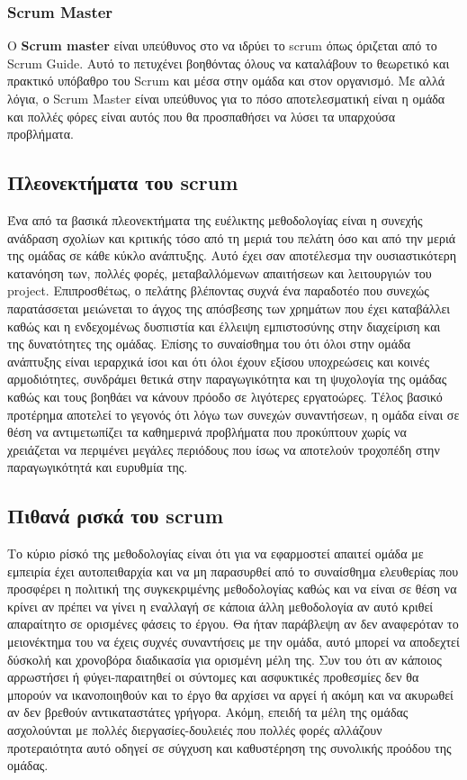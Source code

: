 \subsubsection{Scrum Master}

Ο \textbf{Scrum master} είναι υπεύθυνος στο να ιδρύει το scrum όπως όριζεται από το Scrum Guide. 
Αυτό το πετυχένει βοηθόντας όλους να καταλάβουν το θεωρετικό και πρακτικό υπόβαθρο του Scrum και μέσα στην ομάδα και στον οργανισμό.
Με αλλά λόγια, ο Scrum Master είναι υπεύθυνος για το πόσο αποτελεσματική είναι η ομάδα και πολλές φόρες είναι αυτός που θα προσπαθήσει να λύσει τα υπαρχούσα προβλήματα. 

\subsection{Πλεονεκτήματα του scrum}

Ένα από τα βασικά πλεονεκτήματα της ευέλικτης μεθοδολογίας είναι η συνεχής ανάδραση σχολίων και κριτικής τόσο από τη μεριά του πελάτη όσο και από την μεριά της ομάδας σε κάθε κύκλο ανάπτυξης.
Αυτό έχει σαν αποτέλεσμα την ουσιαστικότερη κατανόηση των, πολλές φορές, μεταβαλλόμενων απαιτήσεων και λειτουργιών του project.
Επιπροσθέτως, ο πελάτης βλέποντας συχνά ένα παραδοτέο που συνεχώς παρατάσσεται μειώνεται το άγχος της απόσβεσης των χρημάτων που έχει καταβάλλει καθώς και η ενδεχομένως δυσπιστία και έλλειψη εμπιστοσύνης στην διαχείριση και της δυνατότητες της ομάδας.
Επίσης το συναίσθημα του ότι όλοι στην ομάδα ανάπτυξης είναι ιεραρχικά ίσοι και ότι όλοι έχουν εξίσου υποχρεώσεις και κοινές αρμοδιότητες, συνδράμει θετικά στην παραγωγικότητα και τη ψυχολογία της ομάδας καθώς και τους βοηθάει να κάνουν πρόοδο σε λιγότερες εργατοώρες.
Τέλος βασικό προτέρημα αποτελεί το γεγονός ότι λόγω των συνεχών συναντήσεων, η ομάδα είναι σε θέση να αντιμετωπίζει τα καθημερινά προβλήματα που προκύπτουν χωρίς να χρειάζεται να περιμένει μεγάλες περιόδους που ίσως να αποτελούν τροχοπέδη στην παραγωγικότητά και ευρυθμία της.

\subsection{Πιθανά ρισκά του scrum}

Το κύριο ρίσκό της μεθοδολογίας είναι ότι για να εφαρμοστεί απαιτεί ομάδα με εμπειρία έχει αυτοπειθαρχία και να μη παρασυρθεί από το συναίσθημα ελευθερίας που προσφέρει η πολιτική της συγκεκριμένης μεθοδολογίας καθώς και να είναι σε θέση να κρίνει αν πρέπει να γίνει η εναλλαγή σε κάποια άλλη μεθοδολογία αν αυτό κριθεί απαραίτητο σε ορισμένες φάσεις το έργου.
Θα ήταν παράβλεψη αν δεν  αναφερόταν το μειονέκτημα του να έχεις συχνές συναντήσεις με την ομάδα, αυτό μπορεί να αποδεχτεί δύσκολή και χρονοβόρα διαδικασία για ορισμένη μέλη της.
Συν του ότι αν κάποιος αρρωστήσει ή φύγει-παραιτηθεί οι σύντομες και ασφυκτικές προθεσμίες δεν θα μπορούν να ικανοποιηθούν και το έργο θα αρχίσει να αργεί ή ακόμη και να ακυρωθεί αν δεν βρεθούν αντικαταστάτες γρήγορα.  
Ακόμη, επειδή τα μέλη της ομάδας ασχολούνται με πολλές διεργασίες-δουλειές που πολλές φορές αλλάζουν προτεραιότητα αυτό οδηγεί σε  σύγχυση και καθυστέρηση της συνολικής προόδου της ομάδας.
